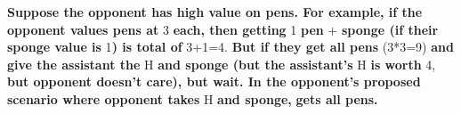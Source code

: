 \documentclass{article}
\newcommand{\cen}[1]{\textbf{\textcolor{English}{#1}}}
\newcommand{\czh}[1]{\textbf{\textcolor{Chinese}{\textchinese{#1}}}}
\begin{document}
\raggedright

\color{Neutral}
\cen{Suppose the opponent has high value on pens. For example, if the opponent values pens at} 3 \cen{each, then getting} 1 \cen{pen} + \cen{sponge (if their sponge value is} 1\cen{) is total of} 3+1=4. \cen{But if they get all pens} (3*3=9) \cen{and give the assistant the} H \cen{and sponge (but the assistant's} H \cen{is worth} 4, \cen{but opponent doesn't care), but wait. In the opponent's proposed scenario where opponent takes} H \cen{and sponge,}\czh{助理} \cen{gets all pens.}
\end{document}
